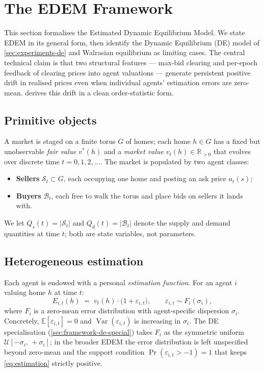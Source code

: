 \section{The EDEM Framework}
\label{sec:framework}

This section formalises the Estimated Dynamic Equilibrium Model. We
state EDEM in its general form, then identify the Dynamic Equilibrium
(DE) model of \cref{sec:experiments-de} and Walrasian equilibrium as
limiting cases. The central technical claim is that two structural
features --- max-bid clearing and per-epoch feedback of clearing
prices into agent valuations --- generate persistent positive drift
in realised prices even when individual agents' estimation errors are
zero-mean.  derives this drift in a
clean order-statistic form.

\subsection{Primitive objects}
\label{sec:framework-primitives}

A market is staged on a finite torus $G$ of homes; each home
$h \in G$ has a fixed but unobservable \emph{fair value} $v^{*}(h)$ and
a \emph{market value} $v_{t}(h) \in \mathbb{R}_{>0}$ that evolves over
discrete time $t = 0, 1, 2, \dots$. The market is populated by two
agent classes:
\begin{itemize}[leftmargin=*]
\item \textbf{Sellers} $\mathcal{S}_{t} \subset G$, each occupying one
      home and posting an ask price $a_{t}(s)$;
\item \textbf{Buyers} $\mathcal{B}_{t}$, each free to walk the torus
      and place bids on sellers it lands with.
\end{itemize}
We let $Q_{s}(t) = |\mathcal{S}_{t}|$ and $Q_{d}(t) = |\mathcal{B}_{t}|$
denote the supply and demand quantities at time $t$; both are
state variables, not parameters.

\subsection{Heterogeneous estimation}
\label{sec:framework-estimation}

Each agent is endowed with a personal \emph{estimation function}.
For an agent $i$ valuing home $h$ at time $t$:
\begin{equation}
\label{eq:estimation}
E_{i,t}(h) \;=\; v_{t}(h) \cdot \bigl(1 + \varepsilon_{i,t}\bigr),
\qquad
\varepsilon_{i,t} \sim F_{i}(\sigma_{i}),
\end{equation}
where $F_{i}$ is a zero-mean error distribution with agent-specific
dispersion $\sigma_{i}$. Concretely, $\mathbb{E}[\varepsilon_{i,t}] = 0$
and $\operatorname{Var}(\varepsilon_{i,t})$ is increasing in
$\sigma_{i}$. The DE specialisation
(\cref{sec:framework-de-special}) takes $F_{i}$ as the symmetric
uniform $\mathcal{U}[-\sigma_{i},\,+\sigma_{i}]$; in the broader
EDEM the error distribution is left unspecified beyond zero-mean and
the support condition $\Pr(\varepsilon_{i,t} > -1) = 1$ that keeps
\cref{eq:estimation} strictly positive.


